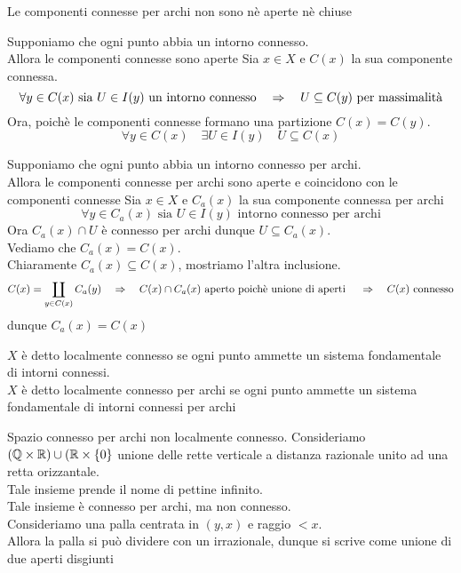 \begin{oss}Le componenti connesse per archi non sono n\`e aperte n\`e chiuse 
\end{oss}
\spazio
\begin{prop}Supponiamo che ogni punto abbia un intorno connesso.\\
Allora le componenti connesse sono aperte
\proof Sia $x\in X$ e $C(x)$ la sua componente connessa.\\
$$ \forall y \in C(x)  \text{ sia } U \in I(y) \text{ un intorno connesso} \quad \Rightarrow \quad U \subseteq C(y) \text{ per massimalit\`a}$$
Ora, poich\`e  le componenti connesse formano una partizione $C(x)=C(y)$.\\
$$ \forall y \in C(x) \quad \exists U \in I(y) \quad U \subseteq C(x)$$
\endproof
\end{prop}
\begin{prop}Supponiamo che ogni punto abbia un intorno connesso per archi.\\
Allora le componenti connesse per archi sono aperte e coincidono con le componenti connesse
\proof
Sia $x\in X$ e $C_a(x)$ la sua componente connessa per archi
$$\forall y \in C_a(x) \text{ sia } U\in I(y) \text{ intorno connesso per archi}$$
Ora $C_a(x) \cap U $ \`e connesso per archi dunque $U\subseteq C_a(x)$.\\
Vediamo che $C_a(x)=C(x)$.\\
Chiaramente $C_a(x) \subseteq C(x)$, mostriamo l'altra inclusione.\\
$$C(x) = \coprod_{y \in C(x)} C_a(y) \quad \Rightarrow \quad C(x) \cap C_a(x) \text{ aperto poich\`e unione di aperti } \quad \Rightarrow \quad C(x) \text{ connesso}$$
dunque $C_a(x)=C(x)$
\endproof
\end{prop}
\begin{defn}$X$ \`e detto localmente connesso se ogni punto ammette un sistema fondamentale di intorni connessi.\\
$X$ \`e detto localmente connesso per archi se ogni punto ammette un sistema fondamentale di intorni connessi per archi
\end{defn}
\spazio
\begin{ese}Spazio connesso  per archi non localmente connesso.
\proof Consideriamo $(\mathbb{Q} \times \mathbb{R}) \cup ( \mathbb{R} \times \{ 0\}$ unione delle rette verticale a distanza razionale unito ad una retta orizzantale.\\
Tale insieme prende il nome di pettine infinito.\\
Tale insieme \`e connesso per archi, ma non connesso.\\
Consideriamo una palla centrata in $(y,x)$ e raggio $<x$.\\
Allora la palla si pu\`o dividere con un irrazionale, dunque si scrive come unione di due aperti disgiunti
\end{ese}
